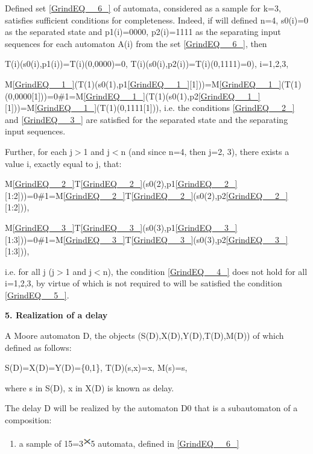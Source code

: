 \documentclass{article}
\begin{document}
Defined set \eqref{GrindEQ__6_} of automata, considered as a sample for k=3, satisfies sufficient conditions for completeness. Indeed, if will defined n=4, s0(i)=0 as the separated state and p1(i)=0000, p2(i)=1111 as the separating input sequences for each automaton A(i) from the set \eqref{GrindEQ__6_}, then

T(i)(s0(i),p1(i))=T(i)(0,0000)=0, T(i)(s0(i),p2(i))=T(i)(0,1111)=0), i=1,2,3,

M\eqref{GrindEQ__1_}(T(1)(s0(1),p1\eqref{GrindEQ__1_}[1]))=M\eqref{GrindEQ__1_}(T(1)(0,0000[1]))=0\#1=M\eqref{GrindEQ__1_}(T(1)(s0(1),p2\eqref{GrindEQ__1_}[1]))=M\eqref{GrindEQ__1_}(T(1)(0,1111[1])), i.e. the conditions \eqref{GrindEQ__2_} and \eqref{GrindEQ__3_} are satisfied for the separated state and the separating input sequences.

Further, for each j$>$1 and j$<$n (and since n=4, then j=2, 3), there exists a value i, exactly equal to j, that:

M\eqref{GrindEQ__2_}T\eqref{GrindEQ__2_}(s0(2),p1\eqref{GrindEQ__2_}[1:2]))=0\#1=M\eqref{GrindEQ__2_}T\eqref{GrindEQ__2_}(s0(2),p2\eqref{GrindEQ__2_}[1:2])),

M\eqref{GrindEQ__3_}T\eqref{GrindEQ__3_}(s0(3),p1\eqref{GrindEQ__3_}[1:3]))=0\#1=M\eqref{GrindEQ__3_}T\eqref{GrindEQ__3_}(s0(3),p2\eqref{GrindEQ__3_}[1:3])),

i.e. for all j (j$>$1 and j$<$n), the condition \eqref{GrindEQ__4_} does not hold for all i=1,2,3, by virtue of which is not required to will be satisfied the condition \eqref{GrindEQ__5_}.

\textbf{5. Realization of a delay}

A Moore automaton D, the objects (S(D),X(D),Y(D),T(D),M(D)) of which defined as follows:

S(D)=X(D)=Y(D)=\{0,1\}, T(D)(s,x)=x, M(s)=s,

where s in S(D), x in X(D) is known as delay.

The delay D will be realized by the automaton D0 that is a subautomaton of a composition:

\begin{enumerate}
\item  a sample of 15=3\includegraphics[bb=0mm 0mm 208mm 296mm, width=3.3mm, height=5.4mm, viewport=3mm 4mm 205mm 292mm]{image10}5 automata, defined in \eqref{GrindEQ__6_}
\end{enumerate}
\end{document}
